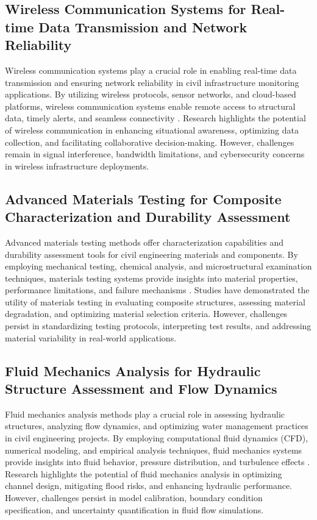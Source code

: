 \documentclass[journal, a4paper]{IEEEtran}
\begin{document}
\subsection{Wireless Communication Systems for Real-time Data Transmission and Network Reliability}

Wireless communication systems play a crucial role in enabling real-time data transmission and ensuring
network reliability in civil infrastructure monitoring applications. By utilizing wireless protocols, sensor
networks, and cloud-based platforms, wireless communication systems enable remote access to structural data,
timely alerts, and seamless connectivity \cite{fang_structural_2024} \cite{zhang_structural_2021} \cite{yifei_structure_2023}. Research highlights the potential of wireless
communication in enhancing situational awareness, optimizing data collection, and facilitating collaborative
decision-making. However, challenges remain in signal interference, bandwidth limitations, and cybersecurity
concerns in wireless infrastructure deployments.

\subsection{Advanced Materials Testing for Composite Characterization and Durability Assessment}
Advanced materials testing methods offer characterization capabilities and durability assessment tools for
civil engineering materials and components. By employing mechanical testing, chemical analysis, and microstructural
examination techniques, materials testing systems provide insights into material properties, performance limitations,
and failure mechanisms \cite{meng_effects_2021} \cite{de_menezes_defect_2021} \cite{bevan_automated_2022}. Studies have demonstrated the utility of materials testing in evaluating
composite structures, assessing material degradation, and optimizing material selection criteria.
However, challenges persist in standardizing testing protocols, interpreting test results, and addressing
material variability in real-world applications.

\subsection{Fluid Mechanics Analysis for Hydraulic Structure Assessment and Flow Dynamics}
Fluid mechanics analysis methods play a crucial role in assessing hydraulic structures, analyzing flow dynamics,
and optimizing water management practices in civil engineering projects. By employing computational fluid dynamics (CFD),
numerical modeling, and empirical analysis techniques, fluid mechanics systems provide insights into fluid behavior,
pressure distribution, and turbulence effects \cite{katunin_identification_2021} \cite{li_physics-informed_2023} \cite{han_crack_2021}. Research highlights the potential of fluid mechanics
analysis in optimizing channel design, mitigating flood risks, and enhancing hydraulic performance. However, challenges
persist in model calibration, boundary condition specification, and uncertainty quantification in fluid flow simulations.
\end{document}
